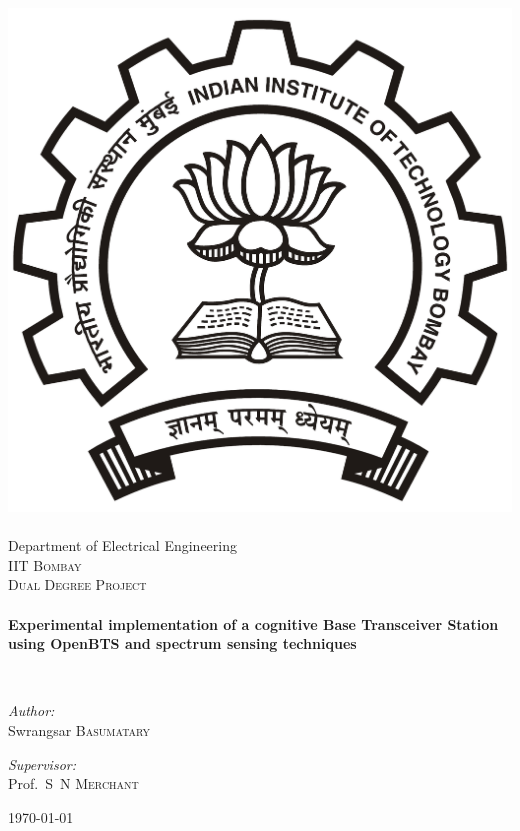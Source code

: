 \begin{titlepage}
\begin{center}

\includegraphics[width=0.23\textheight]{iitbLogo}~\\[1cm]
Department of Electrical Engineering\\[0.3cm]
\textsc{\LARGE IIT Bombay}\\[1.5cm]

\textsc{\Large Dual Degree Project}\\[0.5cm]

\HRule \\[0.4cm]
{ \huge \bfseries Experimental implementation of a cognitive Base Transceiver Station using OpenBTS and spectrum sensing techniques\\[0.4cm] }

\HRule \\[1.5cm]

\begin{minipage}{0.4\textwidth}
\begin{flushleft} \large
\emph{Author:}\\
Swrangsar \textsc{Basumatary}\end{flushleft}
\end{minipage}
\begin{minipage}{0.4\textwidth}
\begin{flushright} \large
\emph{Supervisor:} \\
Prof.~S~N \textsc{Merchant}
\end{flushright}
\end{minipage}

\vfill

{\large \today}

\end{center}
\end{titlepage}
